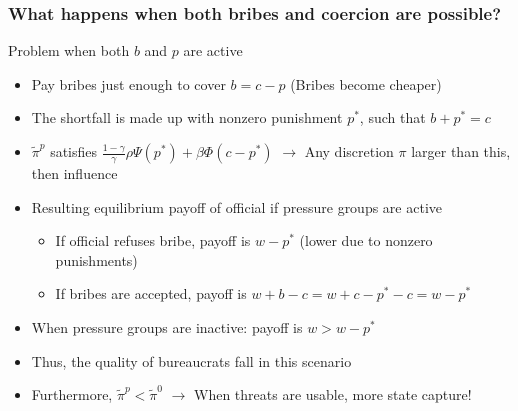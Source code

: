 \documentclass[aspectratio=169]{beamer}
\begin{document}
\begin{frame}
\frametitle{What happens when both bribes and coercion are possible?} 
Problem when both $b$ and $p$ are active
\begin{itemize}\setlength\itemsep{3pt}
\item Pay bribes just enough to cover $b=c-p$ (Bribes become cheaper)
\item The shortfall is made up with nonzero punishment $p^*$, such that $b+p^*=c$
\item $\tilde{\pi}^p$ satisfies $\frac{1-\gamma}{\gamma}\rho\Psi(p^*)+\beta\Phi(c-p^*)$ $\to$ Any discretion $\pi$ larger than this, then influence 
\item Resulting equilibrium payoff of official if pressure groups are active
\begin{itemize}\setlength\itemsep{3pt}
\item If official refuses bribe, payoff is $w-p^*$ (lower due to nonzero punishments)
\item If bribes are accepted, payoff is $w+b-c = w+c-p^* -c = w-p^*$
\end{itemize}
\item When pressure groups are inactive: payoff is $w>w-p^*$
\item Thus, the quality of bureaucrats fall in this scenario
\item Furthermore, $\tilde{\pi}^p<\tilde{\pi}^0$ $\to$ When threats are usable, more state capture!  
\end{itemize}
\end{frame}
\end{document}
